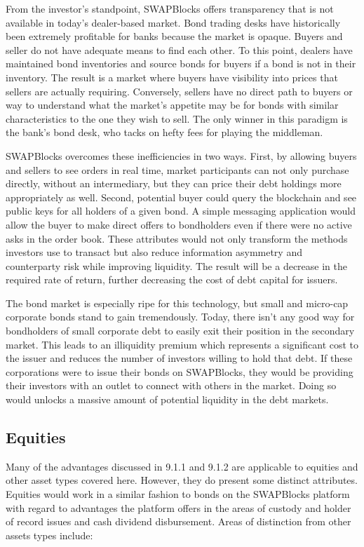 \documentclass[12pt]{article}
\begin{document}
From the investor’s standpoint, SWAPBlocks offers transparency that is not available in today’s dealer-based market. 
Bond trading desks have historically been extremely profitable for banks because the market is opaque. Buyers and 
seller do not have adequate means to find each other. To this point, dealers have maintained bond inventories and 
source bonds for buyers if a bond is not in their inventory. The result is a market where buyers have visibility 
into prices that sellers are actually requiring. Conversely, sellers have no direct path to buyers or way to understand 
what the market’s appetite may be for bonds with similar characteristics to the one they wish to sell. The only 
winner in this paradigm is the bank’s bond desk, who tacks on hefty fees for playing the middleman. 

SWAPBlocks overcomes these inefficiencies in two ways. First, by allowing buyers and sellers to see orders in real time, 
market participants can not only purchase directly, without an intermediary, but they can price their debt holdings more 
appropriately as well. Second, potential buyer could query the blockchain and see public keys for all holders of a given bond. 
A simple messaging application would allow the buyer to make direct offers to bondholders even if there were no active asks in 
the order book. These attributes would not only transform the methods investors use to transact but also reduce information 
asymmetry and counterparty risk while improving liquidity. The result will be a decrease in the required rate of return, 
further decreasing the cost of debt capital for issuers.

The bond market is especially ripe for this technology, but small and micro-cap corporate bonds stand to gain 
tremendously. Today, there isn’t any good way for bondholders of small corporate debt to easily exit their position 
in the secondary market. This leads to an illiquidity premium which represents a significant cost to the issuer and 
reduces the number of investors willing to hold that debt. If these corporations were to issue their bonds on SWAPBlocks, 
they would be providing their investors with an outlet to connect with others in the market. Doing so would unlocks a 
massive amount of potential liquidity in the debt markets.

\subsection{Equities}
Many of the advantages discussed in 9.1.1 and 9.1.2 are applicable to equities and other asset types covered here. 
However, they do present some distinct attributes. Equities would work in a similar fashion to bonds on the SWAPBlocks 
platform with regard to advantages the platform offers in the areas of custody and holder of record issues and cash 
dividend disbursement. Areas of distinction from other assets types include:
\end{document}
